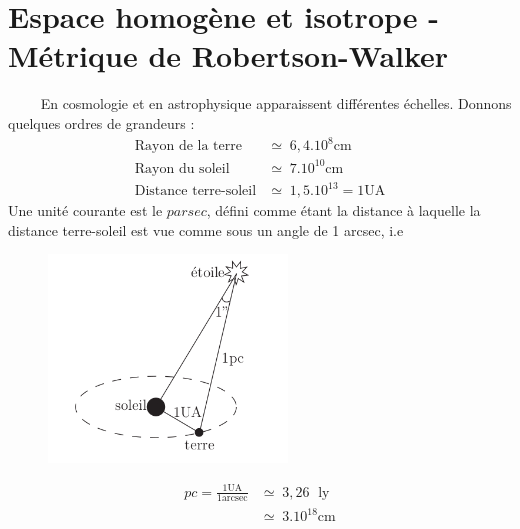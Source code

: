 \documentclass[a4paper,12pt]{report}
\theoremstyle{plain}
\theoremstyle{plain}
\begin{document}
 \section{Espace homog\`ene et isotrope - M\'etrique de Robertson-Walker} 
 $\qquad$ 	 En cosmologie et en astrophysique apparaissent diff\'erentes \'echelles. Donnons quelques ordres de grandeurs :
 \begin{align}
 \text{Rayon de la terre} &\simeq \;6,4.10^8 \text{cm} \\
 \text{Rayon du soleil} & \simeq \;7.10^{10} \text{cm} \\
 \text{Distance terre-soleil} &\simeq \; 1,5.10^{13}  =1\text{UA} 
 \end{align}
 Une unit\'e courante est le $parsec$, d\'efini comme \'etant la distance \`a laquelle la distance terre-soleil est vue comme sous un angle de 1 arcsec, i.e 
 
%  

\begin{figure}[h]
\includegraphics[width=15pc]{t1.png}
\caption{}
\end{figure}
 
 
 \begin{align*}
 pc=\frac{1\text{UA}}{1\text{arcsec}} &\simeq \; 3,26 \; \text{ ly}\\
 & \simeq \; 3.10^{18}\text{cm}
 \end{align*} 
 
\end{document}
